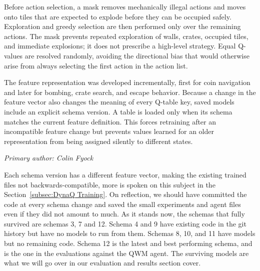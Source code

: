 \documentclass[article, 10pt]{IEEEtran}
\begin{document}
Before action selection, a mask removes mechanically illegal actions and moves onto tiles that are expected to explode before they can be occupied safely. Exploration and greedy selection are then performed only over the remaining actions. The mask prevents repeated exploration of walls, crates, occupied tiles, and immediate explosions; it does not prescribe a high-level strategy. Equal Q-values are resolved randomly, avoiding the directional bias that would otherwise arise from always selecting the first action in the action list.

The feature representation was developed incrementally, first for coin navigation and later for bombing, crate search, and escape behavior. Because a change in the feature vector also changes the meaning of every Q-table key, saved models include an explicit schema version. A table is loaded only when its schema matches the current feature definition. This forces retraining after an incompatible feature change but prevents values learned for an older representation from being assigned silently to different states.

\textit{Primary author: Colin Fyock}

Each schema version has a different feature vector, making the existing trained files not backwards-compatible, more is spoken on this subject in the Section~\ref{subsec:DynaQ Training}. On reflection, we should have committed the code at every schema change and saved the small experiments and agent files even if they did not amount to much. As it stands now, the schemas that fully survived are schemas 3, 7 and 12. Schema 4 and 9 have existing code in the git history but have no models to run from them. Schemas 8, 10, and 11 have models but no remaining code. Schema 12 is the latest and best performing schema, and is the one in the evaluations against the QWM agent. The surviving models are what we will go over in our evaluation and results section cover.
\end{document}
